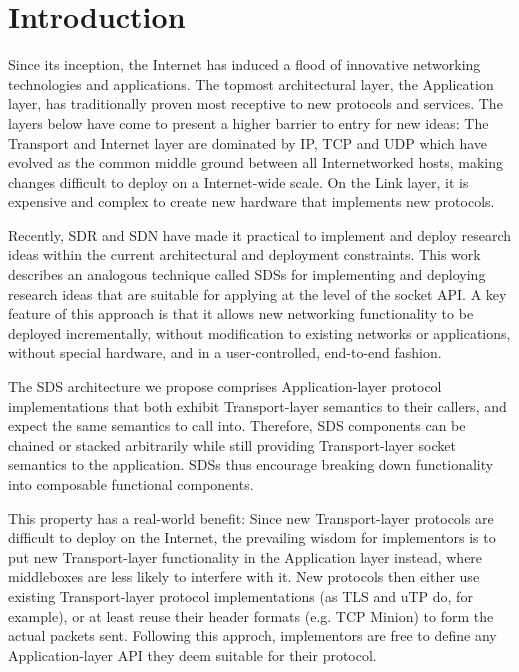 \section{Introduction}


Since its inception, the Internet has induced a flood of innovative
networking technologies and applications. 
The topmost architectural layer, the Application layer, has traditionally 
proven most receptive to new protocols and services. 
The layers below have come to present a higher barrier to entry for 
new ideas: 
The Transport and Internet layer are dominated by 
\ac{IP}, \ac{TCP} and \ac{UDP} which have evolved as 
the common middle ground between all Internetworked hosts, 
making changes difficult to deploy on a Internet-wide scale.
On the Link layer, it is expensive and complex to create new hardware 
that implements new protocols.


Recently, \acf{SDR} and \acf{SDN} have made it practical to implement 
and deploy research ideas within the current architectural and 
deployment constraints.
This work describes an analogous technique called 
\acfp{SDS} for implementing and deploying research ideas 
that are suitable for applying at the level of the socket \ac{API}.
A key feature of this approach is that it 
allows new networking functionality to be deployed incrementally,  
without modification to existing networks or applications, 
without special hardware, %
and in a user-controlled, end-to-end fashion.

The \ac{SDS} architecture we propose comprises Application-layer 
protocol implementations that both exhibit Transport-layer semantics 
to their callers, and expect the same semantics to call into. 
Therefore, \ac{SDS} components can be chained or stacked 
arbitrarily while still providing Transport-layer socket semantics 
to the application. 
\acp{SDS} thus encourage breaking down functionality into composable 
functional components.

This property has a real-world benefit:
Since new Transport-layer protocols are difficult to deploy 
on the Internet, the prevailing wisdom for implementors is to put new
Transport-layer functionality in the Application layer instead,
where middleboxes are less likely to interfere with it. 
New protocols then either use existing Transport-layer protocol
implementations (as TLS and uTP do, for example), or at least reuse
their header formats (e.g. TCP Minion) to form the actual packets
sent. Following this approch, implementors are free to define any 
Application-layer \ac{API} they deem suitable for their protocol. 

